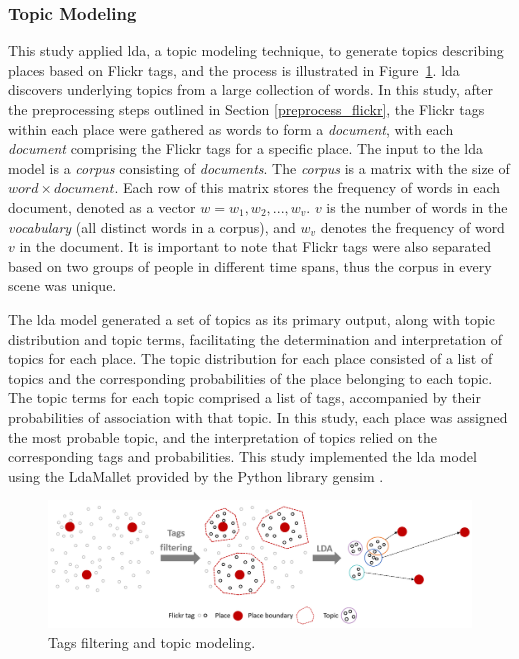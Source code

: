 \documentclass{article}
\theoremstyle{remark}
\begin{document}
\subsubsection{Topic Modeling}

This study applied \acrfull{lda}, a topic modeling technique, to generate topics describing places based on Flickr tags, and the process is illustrated in Figure~\ref{fig:topic_modeling_methodology}. \acrshort{lda} discovers underlying topics from a large collection of words. In this study, after the preprocessing steps outlined in Section \ref{preprocess_flickr}, the Flickr tags within each place were gathered as words to form a \textit{document}, with each \textit{document} comprising the Flickr tags for a specific place. The input to the \acrshort{lda} model is a \textit{corpus} consisting of \textit{documents}. The \textit{corpus} is a matrix with the size of $word \times document$. Each row of this matrix stores the frequency of words in each document, denoted as a vector $w = {w_{1}, w_{2}, ..., w_{v}}$. $v$ is the number of words in the \textit{vocabulary} (all distinct words in a corpus), and $w_{v}$ denotes the frequency of word $v$ in the document. It is important to note that Flickr tags were also separated based on two groups of people in different time spans, thus the corpus in every scene was unique.

The \acrshort{lda} model generated a set of topics as its primary output, along with topic distribution and topic terms, facilitating the determination and interpretation of topics for each place. The topic distribution for each place consisted of a list of topics and the corresponding probabilities of the place belonging to each topic. The topic terms for each topic comprised a list of tags, accompanied by their probabilities of association with that topic. In this study, each place was assigned the most probable topic, and the interpretation of topics relied on the corresponding tags and probabilities. This study implemented the \acrshort{lda} model using the LdaMallet provided by the Python library gensim \citep{rehurek_software_2010}.

\begin{figure} [!h]
\centering
\includegraphics[width=1\textwidth]{figures/topic_modeling_methodology.png}
\caption{\label{fig:topic_modeling_methodology}Tags filtering and topic modeling.}
\end{figure}
\end{document}
